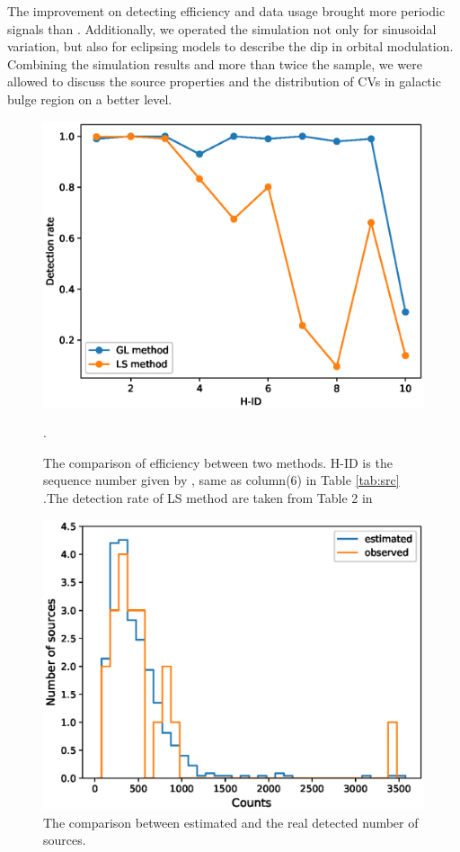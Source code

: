 \documentclass[fleqn,usenatbib]{mnras}
\begin{document}
The improvement on detecting efficiency and data usage brought more periodic signals than \cite{2012ApJ...746..165H}. Additionally, we operated the simulation not only for sinusoidal variation, but also for eclipsing models to describe the dip in orbital modulation. Combining the simulation results and more than twice the sample, we were allowed to discuss the source properties and the distribution of CVs in galactic bulge region on a better level.

\begin{figure}
\includegraphics[scale=0.55]{./figure/sim_LW/Pdet_com.eps}
\caption{The comparison of efficiency between two methods. H-ID is the sequence number given by \citep{2012ApJ...746..165H}, same as column(6) in Table \ref{tab:src} \label{fig:com}.The detection rate of LS method are taken from Table 2 in \citep{2012ApJ...746..165H}}.
\end{figure}
\begin{figure}
\includegraphics[scale=0.53]{./figure/sim_LW/est_obs.eps}
\caption{The comparison between estimated and the real detected number of sources. \label{fig:NP_sim}}
\end{figure}
\end{document}
